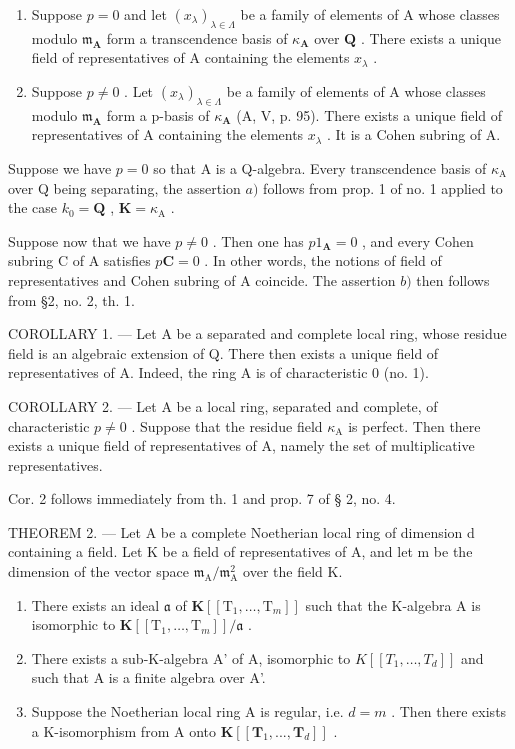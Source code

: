 \begin{enumerate}
\def\labelenumi{\alph{enumi})}
\item
  Suppose \(p = 0\) and let \((x_{\lambda})_{\lambda \in \Lambda}\) be a family of elements of A whose classes modulo \(\mathfrak{m}_{\mathbf{A}}\) form a transcendence basis of \(\kappa_{\mathbf{A}}\) over \(\mathbf{Q}\) . There exists a unique field of representatives of A containing the elements \(x_{\lambda}\) .
\item
  Suppose \(p \neq 0\) . Let \((x_{\lambda})_{\lambda \in \Lambda}\) be a family of elements of A whose classes modulo \(\mathfrak{m}_{\mathbf{A}}\) form a p-basis of \(\kappa_{\mathbf{A}}\) (A, V, p. 95). There exists a unique field of representatives of A containing the elements \(x_{\lambda}\) . It is a Cohen subring of A.
\end{enumerate}

Suppose we have \(p = 0\) so that A is a Q-algebra. Every transcendence basis of \(\kappa_{\mathrm{A}}\) over Q being separating, the assertion \(a)\) follows from prop. 1 of no. 1 applied to the case \(k_0 = \mathbf{Q}\) , \(\mathbf{K} = \kappa_{\mathrm{A}}\) .

Suppose now that we have \(p \neq 0\) . Then one has \(p1_{\mathbf{A}} = 0\) , and every Cohen subring C of A satisfies \(p\mathbf{C} = 0\) . In other words, the notions of field of representatives and Cohen subring of A coincide. The assertion \(b)\) then follows from §2, no. 2, th. 1.

COROLLARY 1. --- Let A be a separated and complete local ring, whose residue field is an algebraic extension of Q. There then exists a unique field of representatives of A. Indeed, the ring A is of characteristic 0 (no. 1).

COROLLARY 2. --- Let A be a local ring, separated and complete, of characteristic \(p \neq 0\) . Suppose that the residue field \(\kappa_{\mathrm{A}}\) is perfect. Then there exists a unique field of representatives of A, namely the set of multiplicative representatives.

Cor. 2 follows immediately from th. 1 and prop. 7 of § 2, no. 4.

THEOREM 2. --- Let A be a complete Noetherian local ring of dimension d containing a field. Let K be a field of representatives of A, and let m be the dimension of the vector space \(\mathfrak{m}_{\mathrm{A}} / \mathfrak{m}_{\mathrm{A}}^{2}\) over the field K.

\begin{enumerate}
\def\labelenumi{\alph{enumi})}
\item
  There exists an ideal \(\mathfrak{a}\) of \(\mathbf{K}[[\mathrm{T}_1,\dots,\mathrm{T}_m]]\) such that the K-algebra A is isomorphic to \(\mathbf{K}[[\mathrm{T}_1,\dots,\mathrm{T}_m]] / \mathfrak{a}\) .
\item
  There exists a sub-K-algebra A' of A, isomorphic to \(K[[T_{1}, \ldots, T_{d}]]\) and such that A is a finite algebra over A'.
\item
  Suppose the Noetherian local ring A is regular, i.e. \(d = m\) . Then there exists a K-isomorphism from A onto \(\mathbf{K}[[\mathbf{T}_1, ..., \mathbf{T}_d]]\) .
\end{enumerate}

